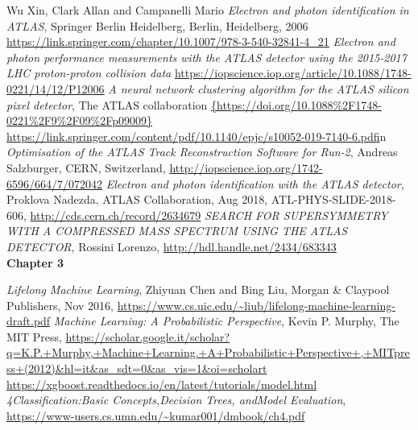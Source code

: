 \documentclass[a4paper, oneside]{book}
\begin{document}
\begin{thebibliography}{17}
			 Wu Xin, Clark Allan and Campanelli Mario \textit{Electron and photon identification in ATLAS}, Springer Berlin Heidelberg, Berlin, Heidelberg, 2006
			\url{https://link.springer.com/chapter/10.1007/978-3-540-32841-4_21} 
			\textit{Electron and photon performance measurements with the {ATLAS} detector using the 2015-2017 {LHC} proton-proton collision data}
			\url{https://iopscience.iop.org/article/10.1088/1748-0221/14/12/P12006}
			 \textit{A neural network clustering algorithm for the ATLAS silicon pixel detector}, The ATLAS collaboration
			\url{{https://doi.org/10.1088%2F1748-0221%2F9%2F09%2Fp09009}}
			\url{https://link.springer.com/content/pdf/10.1140/epjc/s10052-019-7140-6.pdf}in
			 \textit{Optimisation of the ATLAS Track Reconstruction Software for Run-2}, Andreas Salzburger, CERN, Switzerland, \url{http://iopscience.iop.org/1742-6596/664/7/072042}
			 \textit{Electron and photon identification with the ATLAS detector}, Proklova Nadezda, ATLAS Collaboration, Aug 2018, ATL-PHYS-SLIDE-2018-606, \url{http://cds.cern.ch/record/2634679}
			 \textit{SEARCH FOR SUPERSYMMETRY WITH A COMPRESSED MASS SPECTRUM USING THE ATLAS DETECTOR}, Rossini Lorenzo, \url{http://hdl.handle.net/2434/683343 }\\
			
			\textbf{\Large Chapter 3}
			
			 \textit{Lifelong Machine Learning}, Zhiyuan Chen and Bing Liu, Morgan \& Claypool Publishers, Nov 2016, \url{https://www.cs.uic.edu/~liub/lifelong-machine-learning-draft.pdf}
			 \textit{Machine Learning: A Probabilistic Perspective}, Kevin P. Murphy, The MIT Press, \url{https://scholar.google.it/scholar?q=K.P.+Murphy,+Machine+Learning.+A+Probabilistic+Perspective+,+MITpress+(2012)&hl=it&as_sdt=0&as_vis=1&oi=scholart}
			 \url{https://xgboost.readthedocs.io/en/latest/tutorials/model.html}
			 \textit{4Classification:Basic Concepts,Decision Trees, andModel Evaluation}, \url{https://www-users.cs.umn.edu/~kumar001/dmbook/ch4.pdf}
	\end{thebibliography}
\end{document}
